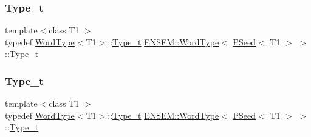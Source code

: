 \subsubsection{\texorpdfstring{Type\_t}{Type\_t}\hspace{0.1cm}{\footnotesize\ttfamily [1/3]}}
{\footnotesize\ttfamily template$<$class T1 $>$ \\
typedef \mbox{\hyperlink{structENSEM_1_1WordType}{Word\+Type}}$<$T1$>$\+::\mbox{\hyperlink{structENSEM_1_1WordType_3_01PSeed_3_01T1_01_4_01_4_a7ec3ab016c8f9b1265ec9fe4ddf9053d}{Type\+\_\+t}} \mbox{\hyperlink{structENSEM_1_1WordType}{E\+N\+S\+E\+M\+::\+Word\+Type}}$<$ \mbox{\hyperlink{classENSEM_1_1PSeed}{P\+Seed}}$<$ T1 $>$ $>$\+::\mbox{\hyperlink{structENSEM_1_1WordType_3_01PSeed_3_01T1_01_4_01_4_a7ec3ab016c8f9b1265ec9fe4ddf9053d}{Type\+\_\+t}}}

\mbox{\label{structENSEM_1_1WordType_3_01PSeed_3_01T1_01_4_01_4_a7ec3ab016c8f9b1265ec9fe4ddf9053d}} 
\subsubsection{\texorpdfstring{Type\_t}{Type\_t}\hspace{0.1cm}{\footnotesize\ttfamily [2/3]}}
{\footnotesize\ttfamily template$<$class T1 $>$ \\
typedef \mbox{\hyperlink{structENSEM_1_1WordType}{Word\+Type}}$<$T1$>$\+::\mbox{\hyperlink{structENSEM_1_1WordType_3_01PSeed_3_01T1_01_4_01_4_a7ec3ab016c8f9b1265ec9fe4ddf9053d}{Type\+\_\+t}} \mbox{\hyperlink{structENSEM_1_1WordType}{E\+N\+S\+E\+M\+::\+Word\+Type}}$<$ \mbox{\hyperlink{classENSEM_1_1PSeed}{P\+Seed}}$<$ T1 $>$ $>$\+::\mbox{\hyperlink{structENSEM_1_1WordType_3_01PSeed_3_01T1_01_4_01_4_a7ec3ab016c8f9b1265ec9fe4ddf9053d}{Type\+\_\+t}}}

\mbox{\label{structENSEM_1_1WordType_3_01PSeed_3_01T1_01_4_01_4_a7ec3ab016c8f9b1265ec9fe4ddf9053d}} 
